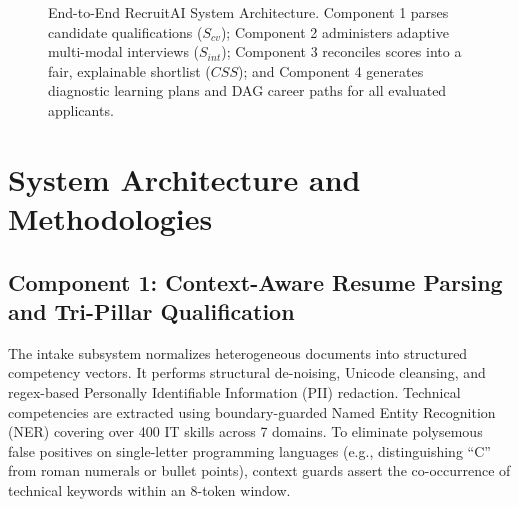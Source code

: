\documentclass[conference]{IEEEtran}
\begin{document}
\begin{figure}[t]
\caption{End-to-End RecruitAI System Architecture. Component 1 parses candidate qualifications ($S_{cv}$); Component 2 administers adaptive multi-modal interviews ($S_{int}$); Component 3 reconciles scores into a fair, explainable shortlist ($CSS$); and Component 4 generates diagnostic learning plans and DAG career paths for all evaluated applicants.}
\label{fig:system_arch}
\end{figure}

\section{System Architecture and Methodologies}

\subsection{Component 1: Context-Aware Resume Parsing and Tri-Pillar Qualification}
The intake subsystem normalizes heterogeneous documents into structured competency vectors. It performs structural de-noising, Unicode cleansing, and regex-based Personally Identifiable Information (PII) redaction. Technical competencies are extracted using boundary-guarded Named Entity Recognition (NER) covering over 400 IT skills across 7 domains. To eliminate polysemous false positives on single-letter programming languages (e.g., distinguishing ``C'' from roman numerals or bullet points), context guards assert the co-occurrence of technical keywords within an 8-token window.
\end{document}
